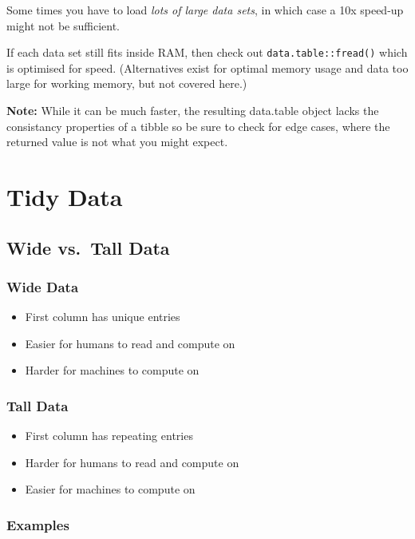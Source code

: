 \documentclass[
  letterpaper,
  DIV=11,
  numbers=noendperiod]{scrreprt}
\begin{document}
Some times you have to load \emph{lots of large data sets}, in which
case a 10x speed-up might not be sufficient.

If each data set still fits inside RAM, then check out
\texttt{data.table::fread()} which is optimised for speed. (Alternatives
exist for optimal memory usage and data too large for working memory,
but not covered here.)

\textbf{Note:} While it can be much faster, the resulting data.table
object lacks the consistancy properties of a tibble so be sure to check
for edge cases, where the returned value is not what you might expect.

\section{Tidy Data}\label{tidy-data}

\subsection{Wide vs.~Tall Data}\label{wide-vs.-tall-data}

\subsubsection{Wide Data}\label{wide-data}

\begin{itemize}
\item
  First column has unique entries
\item
  Easier for humans to read and compute on
\item
  Harder for machines to compute on
\end{itemize}

\subsubsection{Tall Data}\label{tall-data}

\begin{itemize}
\item
  First column has repeating entries
\item
  Harder for humans to read and compute on
\item
  Easier for machines to compute on
\end{itemize}

\subsubsection{Examples}\label{examples}
\end{document}

